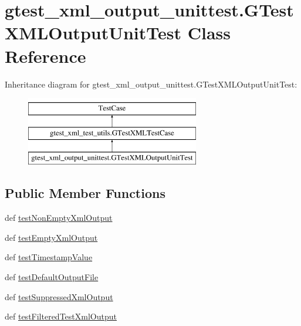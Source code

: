 \hypertarget{classgtest__xml__output__unittest_1_1_g_test_x_m_l_output_unit_test}{\section{gtest\-\_\-xml\-\_\-output\-\_\-unittest.\-G\-Test\-X\-M\-L\-Output\-Unit\-Test Class Reference}
\label{classgtest__xml__output__unittest_1_1_g_test_x_m_l_output_unit_test}
}
Inheritance diagram for gtest\-\_\-xml\-\_\-output\-\_\-unittest.\-G\-Test\-X\-M\-L\-Output\-Unit\-Test\-:\begin{figure}[H]
\begin{center}
\leavevmode
\includegraphics[height=3.000000cm]{classgtest__xml__output__unittest_1_1_g_test_x_m_l_output_unit_test}
\end{center}
\end{figure}
\subsection*{Public Member Functions}
\begin{DoxyCompactItemize}
\item 
def \hyperlink{classgtest__xml__output__unittest_1_1_g_test_x_m_l_output_unit_test_a483e8a54d8f4c37a21825acc7a709f4e}{test\-Non\-Empty\-Xml\-Output}
\item 
def \hyperlink{classgtest__xml__output__unittest_1_1_g_test_x_m_l_output_unit_test_a7f55b18fcace8cfde57b1610c38b5698}{test\-Empty\-Xml\-Output}
\item 
def \hyperlink{classgtest__xml__output__unittest_1_1_g_test_x_m_l_output_unit_test_a6d808cbde3c8afe021716cf3607ea332}{test\-Timestamp\-Value}
\item 
def \hyperlink{classgtest__xml__output__unittest_1_1_g_test_x_m_l_output_unit_test_a4279136c0a0204990eb8029a1433bb36}{test\-Default\-Output\-File}
\item 
def \hyperlink{classgtest__xml__output__unittest_1_1_g_test_x_m_l_output_unit_test_a94baadaf65d7d606cdc2fd892e681b9e}{test\-Suppressed\-Xml\-Output}
\item 
def \hyperlink{classgtest__xml__output__unittest_1_1_g_test_x_m_l_output_unit_test_ad922a8f79f9a5ac38dbbf4248ed083de}{test\-Filtered\-Test\-Xml\-Output}
\end{DoxyCompactItemize}
